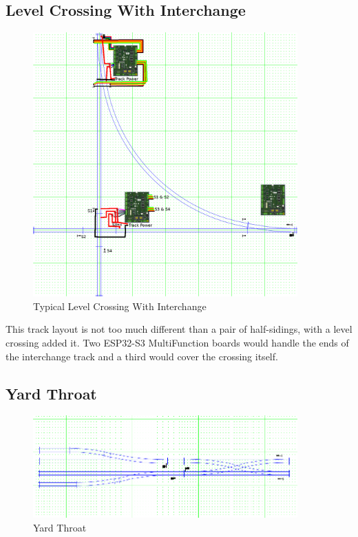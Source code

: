 \subsection{Level Crossing With Interchange}
\label{sec:LevelCrossingInterchange}
\begin{figure}[hbpt]\begin{centering}%
\includegraphics[width=4in]{ESP32S3-LevelCrossingWInterchange.png}
\caption{Typical Level Crossing With Interchange}
\label{fig:LevelCrossingWInterchange}
\end{centering}\end{figure}

This track layout is not too much different than a pair of half-sidings, with 
a level crossing added it.  Two ESP32-S3 MultiFunction boards would handle the 
ends of the interchange track and a third would cover the crossing itself.


\subsection{Yard Throat}
\label{sec:YardThroat}
\begin{figure}[hbpt]\begin{centering}%
\includegraphics[width=4in]{ESP32S3-YardThroat.png}
\caption{Yard Throat}
\label{fig:YardThroat}
\end{centering}\end{figure}

